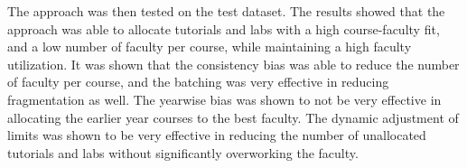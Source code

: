 The approach was then tested on the test dataset. The results showed that the approach was able to allocate tutorials and labs with a high course-faculty fit, and a low number of faculty per course, while maintaining a high faculty utilization. It was shown that the consistency bias was able to reduce the number of faculty per course, and the batching was very effective in reducing fragmentation as well. The yearwise bias was shown to not be very effective in allocating the earlier year courses to the best faculty. The dynamic adjustment of limits was shown to be very effective in reducing the number of unallocated tutorials and labs without significantly overworking the faculty.
